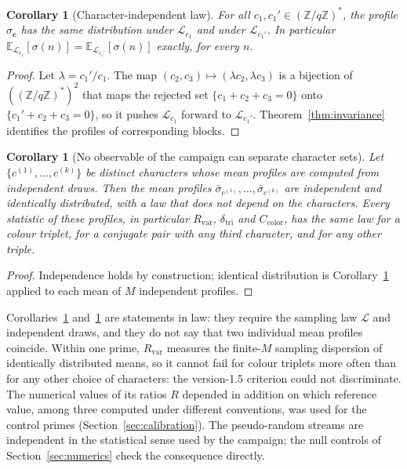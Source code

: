 \documentclass[12pt,a4paper]{article}
\newtheorem{corollary}[theorem]{Corollary}
\theoremstyle{definition}
\theoremstyle{remark}
\newcommand{\Zqs}{(\mathbb{Z}/q\mathbb{Z})^{*}}
\newcommand{\Rvar}{R_{\mathrm{var}}}
\newcommand{\dtri}{\delta_{\mathrm{tri}}}
\newcommand{\Ccol}{C_{\mathrm{color}}}
\begin{document}
  \begin{corollary}[Character-independent law]
    \label{cor:law}
    For all $c_1,c_1'\in\Zqs$, the profile $\sigma_{\mathbf c}$ has the same distribution under
    $\mathcal L_{c_1}$ and under $\mathcal L_{c_1'}$.
    In particular $\mathbb E_{\mathcal L_{c_1}}[\sigma(n)]=\mathbb E_{\mathcal L_{c_1'}}[\sigma(n)]$
    exactly, for every $n$.
  \end{corollary}

  \begin{proof}
    Let $\lambda=c_1'/c_1$.
    The map $(c_2,c_3)\mapsto(\lambda c_2,\lambda c_3)$ is a bijection of $(\Zqs)^2$ that maps
    the rejected set $\{c_1+c_2+c_3=0\}$ onto $\{c_1'+c_2+c_3=0\}$, so it pushes
    $\mathcal L_{c_1}$ forward to $\mathcal L_{c_1'}$.
    Theorem~\ref{thm:invariance} identifies the profiles of corresponding blocks.
  \end{proof}

  \begin{corollary}[No observable of the campaign can separate character sets]
    \label{cor:observables}
    Let $\{c^{(1)},\dots,c^{(k)}\}$ be distinct characters whose mean profiles are computed from
    independent draws.
    Then the mean profiles $\bar\sigma_{c^{(1)}},\dots,\bar\sigma_{c^{(k)}}$ are independent and
    identically distributed, with a law that does not depend on the characters.
    Every statistic of these profiles, in particular $\Rvar$, $\dtri$ and $\Ccol$, has the same law
    for a colour triplet, for a conjugate pair with any third character, and for any other
    triple.
  \end{corollary}

  \begin{proof}
    Independence holds by construction; identical distribution is Corollary~\ref{cor:law}
    applied to each mean of $M$ independent profiles.
  \end{proof}

  Corollaries~\ref{cor:law} and~\ref{cor:observables} are statements in law: they require the
  sampling law $\mathcal L$ and independent draws, and they do not say that two individual mean
  profiles coincide.
  Within one prime, $\Rvar$ measures the finite-$M$ sampling dispersion of identically distributed
  means, so it cannot fail for colour triplets more often than for any other choice of characters:
  the version-1.5 criterion could not discriminate.
  The numerical values of its ratios $R$ depended in addition on which reference value, among three
  computed under different conventions, was used for the control primes (Section~\ref{sec:calibration}).
  The pseudo-random streams are independent in the statistical sense used by the campaign; the
  null controls of Section~\ref{sec:numerics} check the consequence directly.
\end{document}
